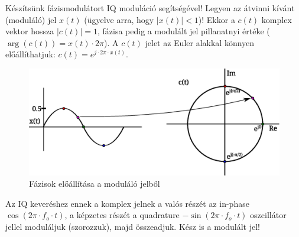 \documentclass[12pt,a4paper]{article}
\begin{document}
Készítsünk fázismodulátort IQ moduláció segítségével! Legyen az átvinni kívánt (moduláló) jel $x(t)$ (ügyelve arra, hogy $\vert x(t) \vert<1$)! Ekkor a $c(t)$ komplex vektor hossza $\vert c(t) \vert = 1$, fázisa pedig a modulált jel pillanatnyi értéke ($\arg(c(t))=x(t) \cdot 2 \pi$). A $c(t)$ jelet az Euler alakkal könnyen előállíthatjuk: $c(t)=e^{j \cdot 2\pi \cdot x(t)}$.

\begin{figure}[H]
\begin{center}
\includegraphics[width=13cm]{figures/modulaciok_workshop_pm.eps}
\caption{Fázisok előállítása a moduláló jelből}
\label{fig:pm}
\end{center}
\end{figure}

Az IQ keveréshez ennek a komplex jelnek a valós részét az in-phase $\cos(2\pi \cdot f_o \cdot t)$, a képzetes részét a quadrature $-\sin(2\pi \cdot f_o \cdot t)$ oszcillátor jellel moduláljuk (szorozzuk), majd összeadjuk. Kész is a modulált jel!
\end{document}
